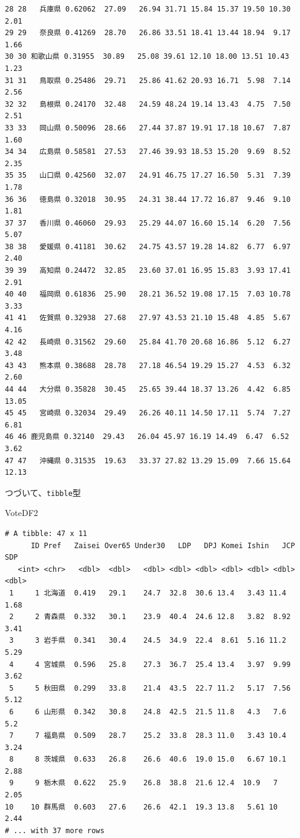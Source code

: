 \documentclass[
  a4paper,
  pandoc,
  ja=standard,
  jafont=haranoaji]{bxjsbook}
\newenvironment{Shaded}{\begin{snugshade}}{\end{snugshade}}
\newcommand{\NormalTok}[1]{\textcolor[rgb]{0.00,0.48,0.65}{#1}}
\begin{document}
\begin{verbatim}
28 28   兵庫県 0.62062  27.09   26.94 31.71 15.84 15.37 19.50 10.30  2.01
29 29   奈良県 0.41269  28.70   26.86 33.51 18.41 13.44 18.94  9.17  1.66
30 30 和歌山県 0.31955  30.89   25.08 39.61 12.10 18.00 13.51 10.43  1.23
31 31   鳥取県 0.25486  29.71   25.86 41.62 20.93 16.71  5.98  7.14  2.56
32 32   島根県 0.24170  32.48   24.59 48.24 19.14 13.43  4.75  7.50  2.51
33 33   岡山県 0.50096  28.66   27.44 37.87 19.91 17.18 10.67  7.87  1.60
34 34   広島県 0.58581  27.53   27.46 39.93 18.53 15.20  9.69  8.52  2.35
35 35   山口県 0.42560  32.07   24.91 46.75 17.27 16.50  5.31  7.39  1.78
36 36   徳島県 0.32018  30.95   24.31 38.44 17.72 16.87  9.46  9.10  1.81
37 37   香川県 0.46060  29.93   25.29 44.07 16.60 15.14  6.20  7.56  5.07
38 38   愛媛県 0.41181  30.62   24.75 43.57 19.28 14.82  6.77  6.97  2.40
39 39   高知県 0.24472  32.85   23.60 37.01 16.95 15.83  3.93 17.41  2.91
40 40   福岡県 0.61836  25.90   28.21 36.52 19.08 17.15  7.03 10.78  3.33
41 41   佐賀県 0.32938  27.68   27.97 43.53 21.10 15.48  4.85  5.67  4.16
42 42   長崎県 0.31562  29.60   25.84 41.70 20.68 16.86  5.12  6.27  3.48
43 43   熊本県 0.38688  28.78   27.18 46.54 19.29 15.27  4.53  6.32  2.60
44 44   大分県 0.35828  30.45   25.65 39.44 18.37 13.26  4.42  6.85 13.05
45 45   宮崎県 0.32034  29.49   26.26 40.11 14.50 17.11  5.74  7.27  6.81
46 46 鹿児島県 0.32140  29.43   26.04 45.97 16.19 14.49  6.47  6.52  3.62
47 47   沖縄県 0.31535  19.63   33.37 27.82 13.29 15.09  7.66 15.64 12.13
\end{verbatim}

つづいて、\texttt{tibble}型

\begin{Shaded}
\begin{Highlighting}[numbers=left,,]
\NormalTok{VoteDF2}
\end{Highlighting}
\end{Shaded}

\begin{verbatim}
# A tibble: 47 x 11
      ID Pref   Zaisei Over65 Under30   LDP   DPJ Komei Ishin   JCP   SDP
   <int> <chr>   <dbl>  <dbl>   <dbl> <dbl> <dbl> <dbl> <dbl> <dbl> <dbl>
 1     1 北海道  0.419   29.1    24.7  32.8  30.6 13.4   3.43 11.4   1.68
 2     2 青森県  0.332   30.1    23.9  40.4  24.6 12.8   3.82  8.92  3.41
 3     3 岩手県  0.341   30.4    24.5  34.9  22.4  8.61  5.16 11.2   5.29
 4     4 宮城県  0.596   25.8    27.3  36.7  25.4 13.4   3.97  9.99  3.62
 5     5 秋田県  0.299   33.8    21.4  43.5  22.7 11.2   5.17  7.56  5.12
 6     6 山形県  0.342   30.8    24.8  42.5  21.5 11.8   4.3   7.6   5.2 
 7     7 福島県  0.509   28.7    25.2  33.8  28.3 11.0   3.43 10.4   3.24
 8     8 茨城県  0.633   26.8    26.6  40.6  19.0 15.0   6.67 10.1   2.88
 9     9 栃木県  0.622   25.9    26.8  38.8  21.6 12.4  10.9   7     2.05
10    10 群馬県  0.603   27.6    26.6  42.1  19.3 13.8   5.61 10     2.44
# ... with 37 more rows
\end{verbatim}
\end{document}
